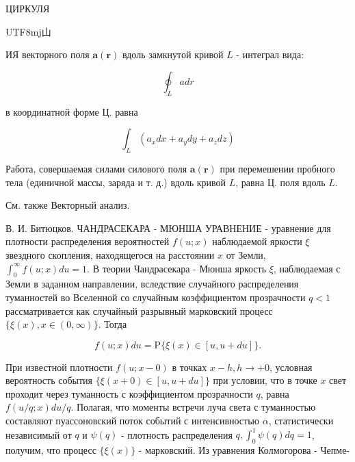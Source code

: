 \documentclass[10pt]{article}
\begin{document}
ЦИРКУЛЯ\begin{CJK}{UTF8}{mj}山\end{CJK}ИЯ векторного поля $\boldsymbol{a}(\boldsymbol{r})$ вдоль замкнутой кривой $L$ - интеграл вида:



\[

\oint_{L} a d r

\]



в координатной форме Ц. равна



\[

\int_{L}\left(a_{x} d x+a_{y} d y+a_{z} d z\right)

\]



Работа, совершаемая силами силового поля $\boldsymbol{a}(\boldsymbol{r})$ при перемешении пробного тела (единичной массы, заряда и т. д.) вдоль кривой $L$, равна Ц. поля вдоль $L$.



См. также Векторный анализ.



В. И. Битюцков. ЧАНДРАСЕКАРА - МЮНША УРАВНЕНИЕ - уравнение для плотности распределения вероятностей $f(u ; x)$ наблюдаемой яркости $\xi$ звездного скопления, находящегося на расстоянии $x$ от Земли, $\int_{0}^{\infty} f(u ; x) d u=1$. В теории Чандрасекара - Мюнша яркость $\xi$, наблюдаемая с Земли в заданном направлении, вследствие случайного распределения туманностей во Вселенной со случайным коэффициентом прозрачности $q<1$ рассматривается как случайный разрывный марковский процесс $\{\xi(x), x \in(0, \infty)\}$. Тогда



\[

f(u ; x) d u=\mathrm{P}\{\xi(x) \in[u, u+d u]\} .

\]



При известной плотности $f(u ; x-0)$ в точках $x-h, h \rightarrow+0$, условная вероятность события $\{\xi(x+0) \in[u, u+d u]\}$ при условии, что в точке $x$ свет проходит через туманность с коэффициентом прозрачности $q$, равна $f(u / q ; x) d u / q$. Полагая, что моменты встречи луча света с туманностью составляют пуассоновский поток событий с интенсивностью $\alpha$, статистически независимый от $q$ и $\psi(q)$ - плотность распределения $q, \int_{0}^{1} \psi(q) d q=1$, получим, что процесс $\{\xi(x)\}$ - марковский. Из уравнения Колмогорова - Чепме-
\end{document}
